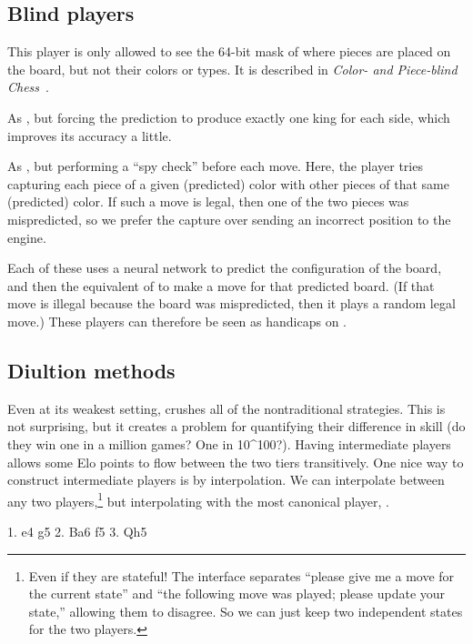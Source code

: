 \documentclass[10pt,preprint,twocolumn]{acmart}
\begin{document}
\subsection{Blind players}

 This player is only allowed to see the
64-bit mask of where pieces are placed on the board, but not their
colors or types. It is described in {\it Color- and Piece-blind
  Chess}~\cite{blind}.

 As , but forcing
the prediction to produce exactly one king for each side, which
improves its accuracy a little.

 As , but
performing a ``spy check'' before each move. Here, the player tries
capturing each piece of a given (predicted) color with other pieces
of that same (predicted) color. If such a move is legal, then one
of the two pieces was mispredicted, so we prefer the capture over
sending an incorrect position to the engine.

Each of these uses a neural network to predict the configuration of
the board, and then the equivalent of  to make a
move for that predicted board. (If that move is illegal because the
board was mispredicted, then it plays a random legal move.) These
players can therefore be seen as handicaps on .

\subsection{Diultion methods}

Even at its weakest setting,  crushes all of the
nontraditional strategies. This is not surprising, but it creates
a problem for quantifying their difference in skill (do they win
one in a million games? One in 10^{100}?). Having intermediate
players allows some Elo points to flow between the two tiers
transitively. One nice way to construct intermediate players is
by interpolation. We can interpolate between any two players,\footnote{
  Even if they are stateful! The interface separates ``please
  give me a move for the current state'' and ``the following
  move was played; please update your state,'' allowing them
  to disagree. So we can just keep two independent states for
  the two players.} but interpolating with the most canonical
player, . 


1. e4 g5 2. Ba6 f5 3. Qh5
\end{document}
